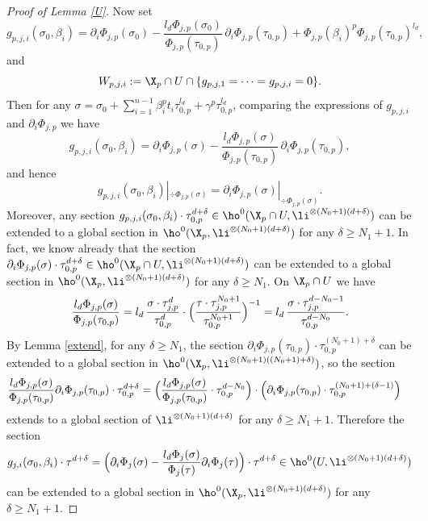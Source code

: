 \begin{proof}[Proof of Lemma \ref{U}]
Now set\vspace*{-3pt}
\[
g_{p, j,i}(\sigma_0,\beta_i)=\partial_i \Phi_{j,p}(\sigma_0)-\frac{l_d\Phi_{j,p}(\sigma_0)}{\Phi_{j,p}(\tau_{0,p})}\, \partial_i\Phi_{j,p}(\tau_{0,p})+\Phi_{j,p}(\beta_i)^p\Phi_{j,p}(\tau_{0,p})^{l_d},
\]
and\vspace*{-3pt}
\[
W_{p,j,i}:=\X_p\cap U\cap \{ g_{p,j,1}=\cdots=g_{p,j,i}=0 \}.
\]
Then for any $\sigma=\sigma_0+\sum_{i=1}^{n-1} \beta_i^pt_i\tau_{0,p}^{l_d}+\gamma^p\tau_{0,p}^{l_d}$, comparing the expressions of $g_{p,j,i}$ and $\partial_i\Phi_{j,p}$ we have\vspace*{-7pt}
\[
g_{p,j,i}(\sigma_0,\beta_i)=\partial_i\Phi_{j,p}(\sigma)-\frac{l_d\Phi_{j,p}(\sigma)}{\Phi_{j,p}(\tau_{0,p})}\,\partial_i\Phi_{j,p}(\tau_{0,p}),
\]
and hence\vspace*{-3pt}
\[
g_{p,j,i}(\sigma_0,\beta_i)|_{ \div \Phi_{j,p}(\sigma)}=\partial_i\Phi_{j,p}(\sigma)|_{ \div \Phi_{j,p}(\sigma)}.
\]
Moreover, any section $g_{p,j,i}(\sigma_0,\beta_i)\cdot \tau_{0,p}^{d+\delta}\in \ho^0(\X_p\cap U, \li^{\otimes (N_0+1)(d+\delta)})$ can be extended to a global section in $\ho^0(\X_p, \li^{\otimes (N_0+1)(d+\delta)})$ for any $\delta\geq N_1+1$. In fact, we know already that the section $\partial_i\Phi_{j,p}(\sigma)\cdot \tau_{0,p}^{d+\delta}\in \ho^0(\X_p\cap U, \li^{\otimes (N_0+1)(d+\delta)})$ can be extended to a global section in $\ho^0(\X_p, \li^{\otimes (N_0+1)(d+\delta)})$ for any $\delta\geq N_1$. On $\X_p\cap U$ we have
\[
\frac{l_d\Phi_{j,p}(\sigma)}{\Phi_{j,p}(\tau_{0,p})}= l_d\,\frac{\sigma \cdot \tau_{j,p}^d}{\tau_{0,p}^d} \cdot\Bigl(\frac{\tau \cdot \tau_{j,p}^{N_0+1}}{\tau_{0,p}^{N_0+1}}\Bigr)^{-1}=l_d\,\frac{\sigma \cdot \tau_{j,p}^{d-N_0-1}}{\tau_{0,p}^{d-N_0}}.
\]
By Lemma \ref{extend}, for any $\delta\geq N_1$, the section $ \partial_i\Phi_{j,p}(\tau_{0,p}) \cdot \tau_{0,p}^{(N_0+1)+\delta}$ can be extended to a global section in $\ho^0(\X_p, \li^{\otimes (N_0+1)((N_0+1)+\delta)})$, so the section
\begin{align*}
\frac{l_d\Phi_{j,p}(\sigma)}{\Phi_{j,p}(\tau_{0,p})} \partial_i\Phi_{j,p}(\tau_{0,p})\cdot \tau_{0,p}^{d+\delta} &= \Bigl(\frac{l_d\Phi_{j,p}(\sigma)}{\Phi_{j,p}(\tau_{0,p})}\cdot \tau_{0,p}^{d-N_0}\Bigr)\cdot \left(\partial_i\Phi_{j,p}(\tau_{0,p}) \cdot \tau_{0,p}^{(N_0+1)+(\delta-1)} \right)
\end{align*}
extends to a global section of $\li^{\otimes (N_0+1)(d+\delta)}$ for any $\delta \geq N_1+1$.
Therefore the section
\[
g_{j,i}(\sigma_0,\beta_i)\cdot \tau^{d+\delta}=\Bigl(\partial_i\Phi_{j}(\sigma)-\frac{l_d\Phi_j(\sigma)}{\Phi_j(\tau)}\partial_i\Phi_j(\tau)\Bigr)\cdot \tau^{d+\delta}\in \ho^0(U, \li^{\otimes (N_0+1)(d+\delta)})
\]
can be extended to a global section in $\ho^0(\X_p, \li^{\otimes (N_0+1)(d+\delta)})$ for any $\delta\geq N_1+1$.


\end{proof}
